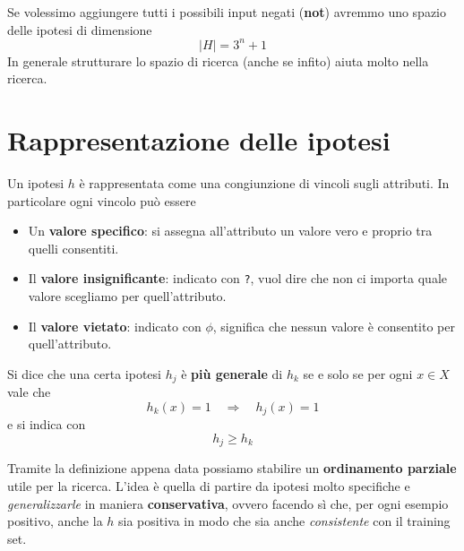 Se volessimo aggiungere tutti i possibili input negati (\textbf{not}) avremmo uno spazio delle ipotesi di dimensione
\[ |H| = 3^n + 1 \]
In generale strutturare lo spazio di ricerca (anche se infito) aiuta molto nella ricerca.

\section{Rappresentazione delle ipotesi}
Un ipotesi $h$ \`e rappresentata come una congiunzione di vincoli sugli attributi. In particolare ogni vincolo pu\`o
essere
\begin{itemize}
	\item Un \textbf{valore specifico}: si assegna all'attributo un valore vero e proprio tra quelli consentiti.
	\item Il \textbf{valore insignificante}: indicato con \verb|?|, vuol dire che non ci importa quale valore
	      scegliamo per quell'attributo.
	\item Il \textbf{valore vietato}: indicato con $\phi$, significa che nessun valore \`e consentito per quell'attributo.
\end{itemize}

\begin{definition}
	Si dice che una certa ipotesi $h_j$ \`e \textbf{pi\`u generale} di $h_k$ se e solo se per ogni $x \in X$ vale che
	\[ h_k(x) = 1 \quad \Rightarrow \quad h_j(x) = 1 \]
	e si indica con
	\[ h_j \geq h_k \]
\end{definition}

Tramite la definizione appena data possiamo stabilire un \textbf{ordinamento parziale} utile per la ricerca.
L'idea \`e quella di partire da ipotesi molto specifiche e \emph{generalizzarle} in maniera \textbf{conservativa},
ovvero facendo s\`i che, per ogni esempio positivo, anche la $h$ sia positiva in modo che sia anche \emph{consistente}
con il training set.

